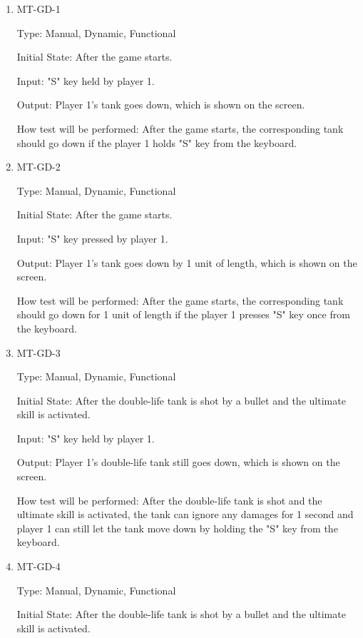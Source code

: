 \documentclass[12pt, titlepage]{article}
\begin{document}
\begin{enumerate}

\item{MT-GD-1\\}

Type: Manual, Dynamic, Functional
					
Initial State: After the game starts.
					
Input: "S" key held by player 1.
					
Output: Player 1's tank goes down, which is shown on the screen.
					
How test will be performed: After the game starts, the corresponding tank should go down if the player 1 holds "S" key from the keyboard. 
					
\item{MT-GD-2\\}

Type: Manual, Dynamic, Functional
					
Initial State: After the game starts.
					
Input: "S" key pressed by player 1.
					
Output: Player 1's tank goes down by 1 unit of length, which is shown on the screen.
					
How test will be performed: After the game starts, the corresponding tank should go down for 1 unit of length if the player 1 presses "S" key once from the keyboard. 

\item{MT-GD-3\\}

Type: Manual, Dynamic, Functional
					
Initial State: After the double-life tank is shot by a bullet and the ultimate skill is activated.
					
Input: "S" key held by player 1.
					
Output: Player 1's double-life tank still goes down, which is shown on the screen.
					
How test will be performed: After the double-life tank is shot and the ultimate skill is activated, the tank can ignore any damages for 1 second and player 1 can still let the tank move down by holding the "S" key from the keyboard.

\item{MT-GD-4\\}

Type: Manual, Dynamic, Functional
					
Initial State: After the double-life tank is shot by a bullet and the ultimate skill is activated.
					

\end{enumerate}
\end{document}
